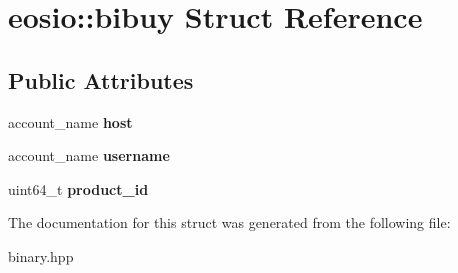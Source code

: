\hypertarget{structeosio_1_1bibuy}{}\section{eosio\+:\+:bibuy Struct Reference}
\label{structeosio_1_1bibuy}
\subsection*{Public Attributes}
\begin{DoxyCompactItemize}
\item 
\mbox{\label{structeosio_1_1bibuy_a0936717349dc543d70272443e2ee5caf}} 
account\+\_\+name {\bfseries host}
\item 
\mbox{\label{structeosio_1_1bibuy_a48e7fb1aa61ce31e4ffe40eb4922c158}} 
account\+\_\+name {\bfseries username}
\item 
\mbox{\label{structeosio_1_1bibuy_ae2872a01e03cde98fffacb48481d81ed}} 
uint64\+\_\+t {\bfseries product\+\_\+id}
\end{DoxyCompactItemize}


The documentation for this struct was generated from the following file\+:\begin{DoxyCompactItemize}
\item 
binary.\+hpp\end{DoxyCompactItemize}
